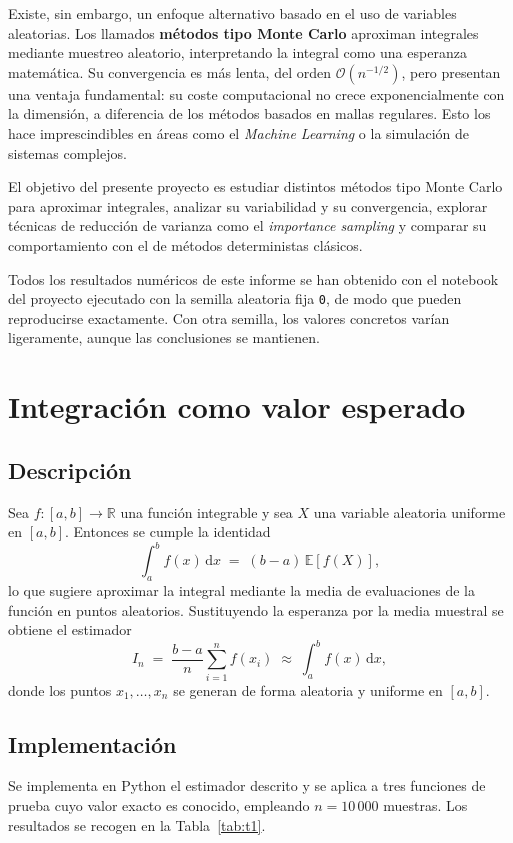\documentclass[11pt,a4paper]{article}
\newcommand{\py}{\textsf{Python}}
\newcommand{\E}{\mathbb{E}}
\begin{document}
Existe, sin embargo, un enfoque alternativo basado en el uso de variables aleatorias. Los llamados \textbf{métodos tipo Monte Carlo} aproximan integrales mediante muestreo aleatorio, interpretando la integral como una esperanza matemática. Su convergencia es más lenta, del orden $\mathcal{O}(n^{-1/2})$, pero presentan una ventaja fundamental: su coste computacional no crece exponencialmente con la dimensión, a diferencia de los métodos basados en mallas regulares. Esto los hace imprescindibles en áreas como el \emph{Machine Learning} o la simulación de sistemas complejos.

El objetivo del presente proyecto es estudiar distintos métodos tipo Monte Carlo para aproximar integrales, analizar su variabilidad y su convergencia, explorar técnicas de reducción de varianza como el \emph{importance sampling} y comparar su comportamiento con el de métodos deterministas clásicos.

Todos los resultados numéricos de este informe se han obtenido con el notebook del proyecto ejecutado con la semilla aleatoria fija \texttt{0}, de modo que pueden reproducirse exactamente. Con otra semilla, los valores concretos varían ligeramente, aunque las conclusiones se mantienen.

\section{Integración como valor esperado}

\subsection{Descripción}
Sea $f:[a,b]\to\mathbb{R}$ una función integrable y sea $X$ una variable aleatoria uniforme en $[a,b]$. Entonces se cumple la identidad
\begin{equation}
\int_a^b f(x)\,\mathrm{d}x \;=\; (b-a)\,\E[f(X)],
\end{equation}
lo que sugiere aproximar la integral mediante la media de evaluaciones de la función en puntos aleatorios. Sustituyendo la esperanza por la media muestral se obtiene el estimador
\begin{equation}
I_n \;=\; \frac{b-a}{n}\sum_{i=1}^{n} f(x_i) \;\approx\; \int_a^b f(x)\,\mathrm{d}x,
\end{equation}
donde los puntos $x_1,\dots,x_n$ se generan de forma aleatoria y uniforme en $[a,b]$.

\subsection{Implementación}
Se implementa en \py{} el estimador descrito y se aplica a tres funciones de prueba cuyo valor exacto es conocido, empleando $n = 10\,000$ muestras. Los resultados se recogen en la Tabla~\ref{tab:t1}.
\end{document}
